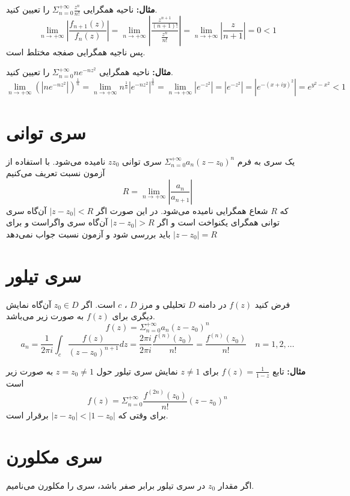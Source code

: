 \documentclass[12pt]{report}
\begin{document}
\textbf{مثال:}
ناحیه همگرایی
$\Sigma_{n = 0}^{+\infty} \frac{z^n}{n!}$
را تعیین کنید.
$$\lim_{n \to +\infty} |\frac{f_{n +1} (z)}{f_n(z)}| = \lim_{n \to +\infty} |\frac{\frac{z^{n +1}}{(n+ 1)!}}{\frac{z^n}{n!}}| = \lim_{n \to +\infty} |\frac{z}{n+1}| = 0 < 1$$ 
پس ناجیه همگرایی صفجه مختلط است.
\newline

\textbf{مثال:}
ناحیه همگرایی
$\Sigma_{n = 0}^{+\infty} ne^{-nz^2}$
را تعیین کنید.
$$\lim_{n \to +\infty} (|ne^{-nz^2}|)^{\frac{1}{n}} = \lim_{n \to +\infty} n^{\frac{1}{n}}|e^{-nz^2}|^{\frac{1}{n}} = \lim_{n \to +\infty} |e^{-z^2}| = |e^{-z^2}| = |e^{-(x + iy)^2}| = e^{y^2 - x^2} < 1$$




\section{سری توانی}
یک سری به فرم 
$\Sigma_{n = 0}^{+\infty} a_n(z - z_0)^n$
سری توانی
$zz_0$
نامیده می‌شود.
با استفاده از آزمون نسبت تعریف می‌کنیم
$$R = \lim_{n \to +\infty} |\frac{a_n}{a_{n+1}}|$$
که 
$R$
شعاع همگرایی نامیده می‌شود.
در این صورت اگر
$|z - z_0|<R$
آن‌گاه سری توانی همگرای یکنواخت است و اگر 
$|z - z_0|>R$
آن‌گاه سری واگراست و برای
$|z - z_0| = R$
باید بررسی شود و آزمون نسبت جواب نمی‌دهد

\section{سری تیلور}
فرض کنید
$f(z)$
در دامنه 
$D$
تحلیلی و مرز
$D$
،
$c$
است.
اگر
$z_0 \in D$
آن‌گاه نمایش دیگری برای
$f(z)$
به صورت زیر می‌باشد.
$$f(z) = \Sigma_{n = 0}^{+\infty} a_n(z - z_0)^n$$
$$a_n = \frac{1}{2\pi i} \int_{c} \frac{f(z)}{(z - z_0)^{n + 1}}dz = \frac{2\pi i }{2\pi i} \frac{f^(n)(z_0)}{n!} = \frac{f^(n)(z_0)}{n!} \quad n = 1, 2, \dots$$
\newline

\textbf{مثال:}
تابع
$f(z) = \frac{1}{1 - z}$
برای
$z \neq 1$
نمایش سری تیلور حول
$z = z_0 \neq 1$
به صورت زیر است
$$f(z) = \Sigma_{n = 0}^{+\infty} \frac{f^{(2n)}(z_0)}{n!}(z - z_0)^n$$
برای وقتی که 
$|z - z_0| < |1 - z_0|$
برقرار است.
\section{سری مکلورن}
اگر مقدار
$z_0$
در سری تیلور برابر صفر باشد، سری را مکلورن می‌نامیم.
\end{document}
